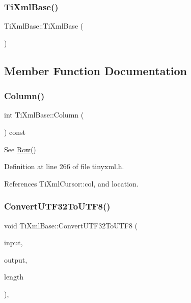 \subsubsection{\texorpdfstring{Ti\+Xml\+Base()}{TiXmlBase()}\hspace{0.1cm}{\footnotesize\ttfamily [2/2]}}
{\footnotesize\ttfamily Ti\+Xml\+Base\+::\+Ti\+Xml\+Base (\begin{DoxyParamCaption}\item[{const \hyperlink{class_ti_xml_base}{Ti\+Xml\+Base} \&}]{ }\end{DoxyParamCaption})\hspace{0.3cm}{\ttfamily [private]}}



\subsection{Member Function Documentation}
\hypertarget{class_ti_xml_base_ad283b95d9858d5d78c334f4a61b07bb4}{}\label{class_ti_xml_base_ad283b95d9858d5d78c334f4a61b07bb4} 
\subsubsection{\texorpdfstring{Column()}{Column()}}
{\footnotesize\ttfamily int Ti\+Xml\+Base\+::\+Column (\begin{DoxyParamCaption}{ }\end{DoxyParamCaption}) const\hspace{0.3cm}{\ttfamily [inline]}}



See \hyperlink{class_ti_xml_base_ad0cacca5d76d156b26511f46080b442e}{Row()} 



Definition at line 266 of file tinyxml.\+h.



References Ti\+Xml\+Cursor\+::col, and location.

\hypertarget{class_ti_xml_base_a07c765e3a7f979d343e646ea797b180b}{}\label{class_ti_xml_base_a07c765e3a7f979d343e646ea797b180b} 
\subsubsection{\texorpdfstring{Convert\+U\+T\+F32\+To\+U\+T\+F8()}{ConvertUTF32ToUTF8()}}
{\footnotesize\ttfamily void Ti\+Xml\+Base\+::\+Convert\+U\+T\+F32\+To\+U\+T\+F8 (\begin{DoxyParamCaption}\item[{unsigned long}]{input,  }\item[{char $\ast$}]{output,  }\item[{int $\ast$}]{length }\end{DoxyParamCaption})\hspace{0.3cm}{\ttfamily [static]}, {\ttfamily [protected]}}



